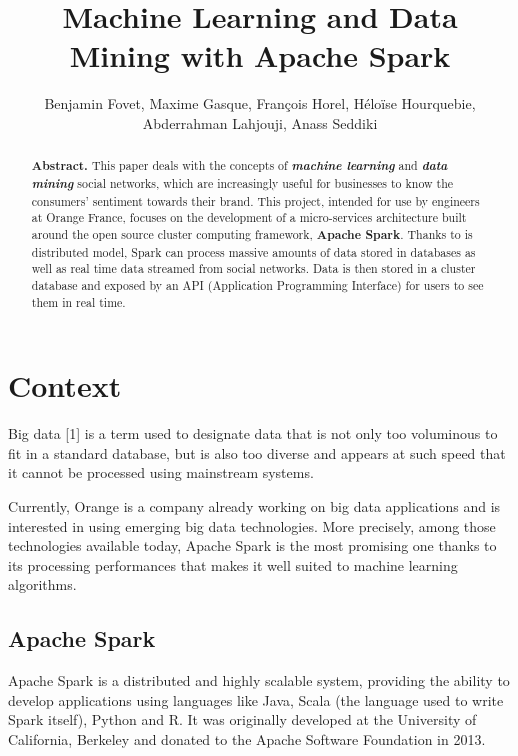 \documentclass[11pt]{article}
\title{\textbf{Machine Learning and Data Mining with Apache Spark}}
\author{Benjamin Fovet, Maxime Gasque, François Horel, Héloïse Hourquebie, \\Abderrahman Lahjouji, Anass Seddiki}
\affil{\texttt{\{bfovet, mgasque, fhorel, hhourquebie, alahjouji, aseddiki\} \\ \texttt{@enseirb-matmeca.fr}}}
\date{}
\begin{document}
\maketitle

\begin{abstract}
\textbf{Abstract.} This paper deals with the concepts of \textbf{\textit{machine learning}} and \textbf{\textit{data mining}} social networks, which are increasingly useful for businesses to know the consumers' sentiment towards their brand. This project, intended for use by engineers at \textsf{Orange France}, focuses on the development of a micro-services architecture built around the open source cluster computing framework, \textsf{\textbf{Apache Spark}}. Thanks to is distributed model, \textsf{Spark} can process massive amounts of data stored in databases as well as real time data streamed from social networks. Data is then stored in a cluster database and exposed by an API (Application Programming Interface) for users to see them in real time.
\end{abstract}

\section{Context}
Big data [1] is a term used to designate data that is not only too voluminous to fit in a standard database, but is also too diverse and appears at such speed that it cannot be processed using mainstream systems. 
\vskip 9pt

Currently, \textsf{Orange} is a company already working on big data applications and is interested in using emerging big data technologies. More precisely, among those technologies available today, \textsf{Apache Spark} is the most promising one thanks to its processing performances that makes it well suited to machine learning algorithms.

\subsection{Apache Spark}
\label{apache spark}
\textsf{Apache Spark} is a distributed and highly scalable system, providing the ability to develop applications using languages like \textsf{Java}, \textsf{Scala} (the language used to write \textsf{Spark} itself), \textsf{Python} and \textsf{R}. It was originally developed at the University of California, Berkeley and donated to the Apache Software Foundation in 2013.
\end{document}
